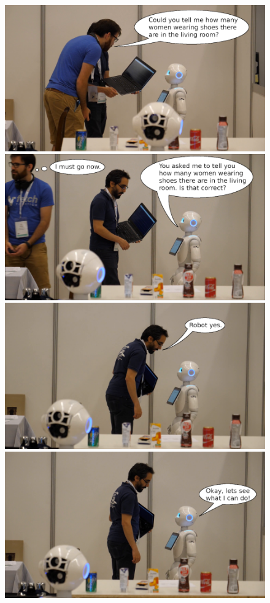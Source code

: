 \begin{figure}[]
	\centering
	\includegraphics[width=.8\textwidth]{bilder/motivation/intro_1_edit.png}\\\vspace{3pt}
	\includegraphics[width=.8\textwidth]{bilder/motivation/intro_2_edit.png}\\\vspace{3pt}
	\includegraphics[width=.8\textwidth]{bilder/motivation/intro_3_edit.png}\\\vspace{3pt}
	\includegraphics[width=.8\textwidth]{bilder/motivation/intro_4_edit.png}\\\vspace{3pt}
	

\end{figure}
